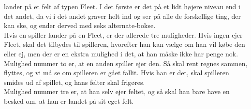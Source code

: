 lander på et  felt af typen Fleet. I det første er det på et lidt højere niveau
end i det  andet, da vi i det andet graver helt ind og ser på alle de
forskellige ting, der  kan ske, og ender derved med seks alternate-bokse.\\
\indent Hvis en spiller lander på en Fleet, er der allerede tre muligheder. Hvis
ingen ejer Fleet, skal det tilbydes til spilleren, hvorefter han kan vælge om han vil
købe den eller ej,  men der er en ekstra mulighed i det, at han måske ikke har
penge nok.\\
\indent Mulighed nummer to er, at en anden spiller ejer den. Så skal rent regnes
sammen, flyttes, og vi må se om spilleren er gået fallit. Hvis han er det, skal 
spilleren smides ud af spillet, og hans felter skal frigøres.\\
\indent Mulighed nummer tre er, at han selv ejer feltet, og så skal han bare
have en besked om, at han er landet på sit eget felt.
